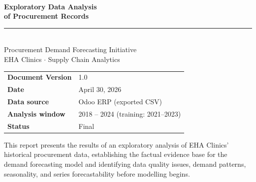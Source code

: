 \documentclass[12pt, a4paper]{article}
\begin{document}
\begin{titlepage}
  \pagecolor{ehaBlue}\color{white}
  \vspace*{1.8cm}

  {\fontsize{10}{12}\selectfont\MakeUppercase{}}\\[0.5em]
  {\fontsize{26}{32}\selectfont\bfseries Exploratory Data Analysis\\[0.3em]
   of Procurement Records}\\[1.2em]
  \textcolor{ehaAccent}{\rule{6cm}{2pt}}\\[1.2em]

  {\large Procurement Demand Forecasting Initiative}\\[0.4em]
  {\normalsize EHA Clinics $\cdot$ Supply Chain Analytics}\\[2.5cm]

  \begin{tabular}{@{}ll}
    \textbf{Document Version} & 1.0 \\[0.4em]
    \textbf{Date}             & April 30, 2026 \\[0.4em]
    \textbf{Data source}      & Odoo ERP (exported CSV) \\[0.4em]
    \textbf{Analysis window}  & 2018 -- 2024 (training: 2021--2023) \\[0.4em]
    \textbf{Status}           & Final \\
  \end{tabular}

  \vfill
  {\small\textcolor{white!70!ehaBlue}
    {This report presents the results of an exploratory analysis of EHA Clinics'
     historical procurement data, establishing the factual evidence base for
     the demand forecasting model and identifying data quality issues,
     demand patterns, seasonality, and series forecastability before modelling begins.}}
\end{titlepage}
\pagecolor{white}\color{black}

\newpage
\end{document}
